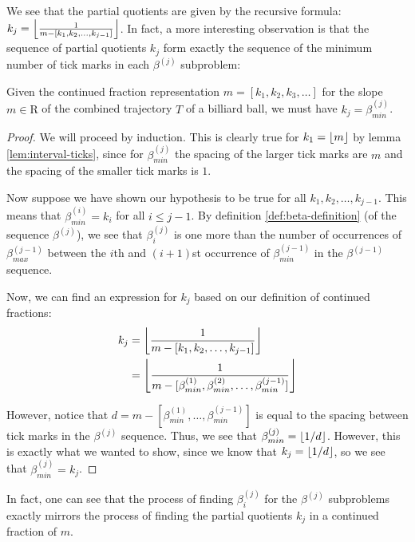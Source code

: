 We see that the partial quotients are given by the recursive formula: $k_j = \floor{\frac{1}{m - [k_1, k_2, \ldots, k_{j-1}]}}$. In fact, a more interesting observation is that the sequence of partial quotients $k_j$ form exactly the sequence of the minimum number of tick marks in each $\beta^{(j)}$ subproblem:

\begin{theorem}
  Given the continued fraction representation $m = [k_1, k_2, k_3, \ldots]$ for the slope $m \in \mathrm{R}$ of the combined trajectory $T$ of a billiard ball, we must have $k_j = \beta_{min}^{(j)}$.
\end{theorem}
\begin{proof}
  We will proceed by induction. This is clearly true for $k_1 = \floor{m}$ by lemma \ref{lem:interval-ticks}, since for $\beta_{min}^{(j)}$ the spacing of the larger tick marks are $m$ and the spacing of the smaller tick marks is $1$.

  Now suppose we have shown our hypothesis to be true for all $k_1, k_2, \ldots, k_{j-1}$. This means that $\beta_{min}^{(i)} = k_{i}$ for all $i \leq j-1$. By definition \ref{def:beta-definition} (of the sequence $\beta^{(j)}$), we see that $\beta_i^{(j)}$ is one more than the number of occurrences of $\beta^{(j-1)}_{max}$ between the $i$th and $(i+1)$st occurrence of $\beta^{(j-1)}_{min}$ in the $\beta^{(j-1)}$ sequence.

  Now, we can find an expression for $k_{j}$ based on our definition of continued fractions:
  \begin{align}
    k_j &= \floor{\frac{1}{m - [k_1, k_2, \ldots, k_{j-1}]}} \\
        &= \floor{\frac{1}{m - [\beta_{min}^{(1)}, \beta_{min}^{(2)}, \ldots, \beta_{min}^{(j-1)}]}}
  \end{align}

  However, notice that $d = m - [\beta_{min}^{(1)}, \ldots, \beta_{min}^{(j-1)}]$ is equal to the spacing between tick marks in the $\beta^{(j)}$ sequence. Thus, we see that $\beta_{min}^{(j)} = \floor{1/d}$. However, this is exactly what we wanted to show, since we know that $k_j = \floor{1/d}$, so we see that $\beta_{min}^{(j)} = k_j$.
\end{proof}

In fact, one can see that the process of finding $\beta^{(j)}_i$ for the $\beta^{(j)}$ subproblems exactly mirrors the process of finding the partial quotients $k_j$ in a continued fraction of $m$.
